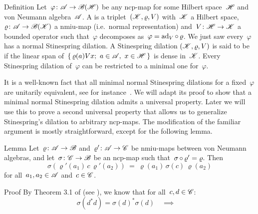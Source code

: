 \documentclass[b]{subfiles}
\begin{document}
\begin{parsec}%
\begin{point}{Definition}%
Let~$\varphi\colon \mathscr{A} \to \mathscr{B}(\mathscr{H})$
    be any ncp-map
    for some Hilbert space~$\mathscr{H}$ and von Neumann algebra~$\mathscr{A}$.
A 
    is a triplet~$(\mathscr{K},\varrho, V)$
    with~$\mathscr{K}$ a Hilbert space,
    $\varrho\colon \mathscr{A} \to \mathscr{B}(\mathscr{K})$ a nmiu-map
        (i.e.~normal representation)
        and~$V\colon \mathscr{H} \to \mathscr{K}$ a bounded operator
        such that~$\varphi$ decomposes as~$\varphi = \mathrm{ad}_V \mathop{\circ} \varrho$.
We just saw every~$\varphi$ has a normal Stinespring dilation.
A Stinespring dilation
$(\mathscr{K},\varrho,V)$ is said to be 
if the linear span of~$\{ \,\varrho(a) Vx; \ a \in \mathscr{A},\ x\in \mathscr{H}\,\}$
is dense in~$\mathscr{K}$.
Every Stinespring dilation of~$\varphi$ can be restricted to a minimal one
    for~$\varphi$.
\end{point}
\begin{point}%
It is a well-known fact that all minimal normal Stinespring dilations
    for a fixed~$\varphi$ are unitarily equivalent,
    see for instance~\cite[Proposition 4.2]{paulsen}.
We will adapt its proof to show that a minimal normal Stinespring
    dilation admits a universal property.
Later we will use this to prove a second universal property 
    that allows us to generalize Stinespring's dilation to
    arbitrary ncp-maps.
The modification of the familiar argument
    is mostly straightforward, except for the following lemma.
\end{point}
\begin{point}{Lemma}%
Let~$\varrho\colon \mathscr{A} \to \mathscr{B}$ and~$\varrho'\colon \mathscr{A} \to \mathscr{C}$
    be nmiu-maps between von Neumann algebras,
        and let~$\sigma \colon \mathscr{C} \to \mathscr{B}$ be an ncp-map
        such that~$\sigma \mathop{\circ} \varrho' = \varrho$. Then
\begin{equation*}
\sigma(\varrho'(a_1)\,c\, \varrho'(a_2)) \ =\   \varrho(a_1) \,\sigma(c) \,\varrho(a_2)
\end{equation*}
    for all~$a_1,a_2 \in \mathscr{A}$ and~$c \in \mathscr{C}$.
\begin{point}{Proof}%
By Theorem 3.1 of \cite{choi} (see ),
we know that for all~$c,d\in\mathscr{C}$:
\begin{equation}
    \sigma(d^*d) = \sigma(d)^*\sigma(d) \quad \implies \quad

\end{equation}
\end{point}
\end{point}
\end{parsec}
\end{document}
